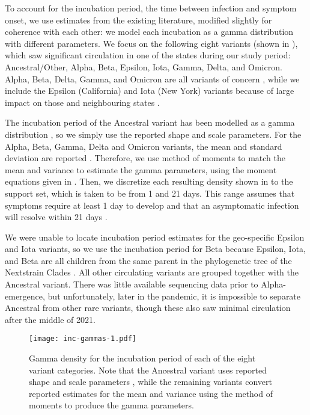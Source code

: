 To account for the incubation period, the time between infection and symptom
onset, we use estimates from the existing literature, modified slightly for
coherence with each other: we model each incubation as a gamma distribution with
different parameters. We focus on the following eight variants (shown in
), which saw significant circulation in one of the \US states
during our study period: Ancestral/Other, Alpha, Beta, Epsilon,
Iota, Gamma, Delta, and Omicron. Alpha, Beta, Delta, Gamma, and Omicron are all
variants of concern \citep{who2021tracking}, while we include the Epsilon
(California) and Iota (New York) variants because of large impact on those and
neighbouring states \citep{yang2022investigation, duerr2021dominance}.

The incubation period of the Ancestral variant has been modelled as a gamma
distribution \citep{tindale2020evidence}, so we simply use the reported shape
and scale parameters. For the Alpha, Beta, Gamma, Delta and Omicron variants,
the mean and standard deviation are reported \citep{tanaka2022shorter,
grant2022impact, ogata2022shorter}. Therefore, we use method of moments to match
the mean and variance to estimate the gamma parameters, using the moment
equations given in . Then, we discretize each resulting density
shown in  to the support set, which is taken to be from 1
and 21 days. This range assumes that symptoms require at least 1 day to develop
\citealp{phcan2021covid} and that an asymptomatic infection will resolve within
21 days \citep{zaki2021estimations,cortes2022sars}.

We were unable to locate incubation period estimates for the geo-specific
Epsilon and Iota variants, so we use the incubation period for Beta because
Epsilon, Iota, and Beta are all children from the same parent in the
phylogenetic tree of the Nextstrain Clades \citep{hodcroft2021covariants}. All
other circulating variants are grouped together with the Ancestral variant.
There was little available sequencing data prior to Alpha-emergence, but
unfortunately, later in the pandemic, it is impossible to separate Ancestral
from other rare variants, though these also saw minimal circulation after
the middle of 2021.

\begin{figure}[!tb]
\centering
    \texttt{[image: inc-gammas-1.pdf]}
    \caption{Gamma density for the incubation period of each of the eight
    variant categories. Note that the Ancestral variant uses reported shape and
    scale parameters \citep{tindale2020evidence}, while the remaining variants
    convert reported estimates for the mean and variance
    \citep{tanaka2022shorter,grant2022impact,ogata2022shorter} using the method
    of moments to produce the gamma parameters.}
    \label{fig:inc_gammas}
\end{figure}





